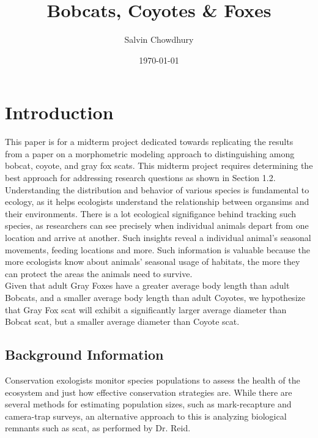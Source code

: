 \documentclass[a4paper]{article}
\title{Bobcats, Coyotes \& Foxes}
\author{Salvin Chowdhury}
\date{\today}
\begin{document}
\setlength{\intextsep}{0pt} 
\setlength{\textfloatsep}{5pt} 

\maketitle

\newpage 
\tableofcontents
\newpage  

\section{Introduction}
This paper is for a midterm project dedicated towards replicating the results from a paper on a morphometric modeling approach to distinguishing among
bobcat, coyote, and gray fox scats. This midterm project requires determining the best approach for addressing research questions as shown in Section 1.2. \\

\noindent Understanding the distribution and behavior of various species is fundamental to ecology, as it helps ecologists understand the relationship between
organsims and their environments. There is a lot ecological signifigance behind tracking such species, as researchers can see precisely when individual 
animals depart from one location and arrive at another. Such insights reveal a individual animal's seasonal movements, feeding locations and more. Such
information is valuable because the more ecologists know about animals' seasonal usage of habitats, the more they can protect the areas the animals need to
survive. \\

\noindent Given that adult Gray Foxes have a greater average body length than adult Bobcats, and a smaller average body length than adult Coyotes, we hypothesize 
that Gray Fox scat will exhibit a significantly larger average diameter than Bobcat scat, but a smaller average diameter than Coyote scat.

\subsection{Background Information}
Conservation exologists monitor species populations to assess the health of the ecosystem and just how effective conservation strategies are. While there are
several methods for estimating population sizes, such as mark-recapture and camera-trap surveys, an alternative approach to this is analyzing biological 
remnants such as scat, as performed by Dr. Reid. \\
\end{document}
